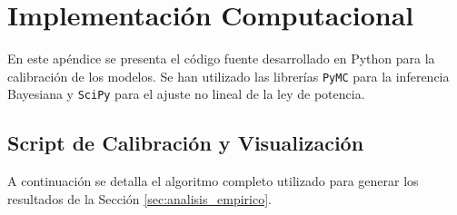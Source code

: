\section{Implementación Computacional}
\label{app:codigo}

En este apéndice se presenta el código fuente desarrollado en Python para la calibración de los modelos. Se han utilizado las librerías \texttt{PyMC} para la inferencia Bayesiana y \texttt{SciPy} para el ajuste no lineal de la ley de potencia.

\subsection{Script de Calibración y Visualización}

A continuación se detalla el algoritmo completo utilizado para generar los resultados de la Sección \ref{sec:analisis_empirico}.

